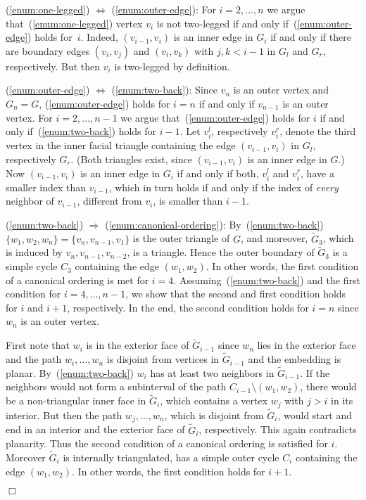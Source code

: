 \documentclass[11pt]{article}
\newenvironment{proof}{{\bf Proof:} }{\hspace*{\fill}$\Box$\vspace{2mm}}
\begin{document}
\begin{proof}
  (\ref{enum:one-legged}) $\Longleftrightarrow$ (\ref{enum:outer-edge}):
  For $i = 2,\ldots,n$ we argue that~(\ref{enum:one-legged}) vertex $v_i$
	is not two-legged
	if and only if~(\ref{enum:outer-edge}) holds for~$i$. Indeed,
  $(v_{i-1},v_i)$ is an inner edge in $G_i$ if and only if there are
  boundary edges $(v_i,v_j)$ and $(v_i,v_k)$ with $j, k < i-1$ in
  $G_l$ and $G_r$, respectively. But then $v_i$
	is two-legged by definition.

  (\ref{enum:outer-edge}) $\Longleftrightarrow$ (\ref{enum:two-back}):
  Since $v_n$ is an outer vertex and $G_n = G$, (\ref{enum:outer-edge})
  holds for $i = n$ if and only if $v_{n-1}$ is an outer vertex. For
  $i = 2,\ldots,n-1$ we argue that~(\ref{enum:outer-edge}) holds for $i$
  if and only if~(\ref{enum:two-back}) holds for $i-1$. Let $v_i^l$,
  respectively $v_i^r$, denote the third vertex in the inner facial
  triangle containing the edge $(v_{i-1},v_i)$ in $G_l$, respectively
  $G_r$. (Both triangles exist, since $(v_{i-1},v_i)$ is an inner edge
  in $G$.) Now $(v_{i-1},v_i)$ is an inner edge in $G_i$ if and only
  if both, $v_i^l$ and $v_i^r$, have a smaller index than $v_{i-1}$,
  which in turn holds if and only if the index of \emph{every}
  neighbor of $v_{i-1}$, different from $v_i$, is smaller than $i-1$.

  (\ref{enum:two-back}) $\Longrightarrow$ (\ref{enum:canonical-ordering}):
  By~(\ref{enum:two-back}) $\{w_1,w_2,w_n\} = \{v_n,v_{n-1},v_1\}$ is
  the outer triangle of $G$, and moreover, $\tilde{G}_3$, which is
  induced by $v_n,v_{n-1},v_{n-2}$, is a triangle. Hence the outer
  boundary of $\tilde{G}_3$ is a simple cycle $C_3$ containing the
  edge $(w_1,w_2)$. In other words, the first condition of a canonical
  ordering is met for $i=4$. Assuming~(\ref{enum:two-back}) and the
  first condition for $i = 4,\ldots,n-1$, we show that the second and
  first condition holds for $i$ and $i+1$, respectively. In the end,
  the second condition holds for $i = n$ since $w_n$ is an outer
  vertex.

  First note that $w_i$ is in the exterior face of $\tilde{G}_{i-1}$
  since $w_n$ lies in the exterior face and the path $w_i,\ldots,w_n$
  is disjoint from vertices in $\tilde{G}_{i-1}$ and the embedding is
  planar. By~(\ref{enum:two-back}) $w_i$ has at least two neighbors in
  $\tilde{G}_{i-1}$. If the neighbors would not form a subinterval of the path
  $C_{i-1} \setminus (w_1,w_2)$, there would be a non-triangular inner
  face in $\tilde{G}_i$, which contains a vertex $w_j$ with $j > i$ in
  its interior. But then the path $w_j,\ldots,w_n$, which is disjoint
  from $\tilde{G}_i$, would start and end in an interior and the
  exterior face of $\tilde{G}_i$, respectively. This again contradicts
  planarity. Thus the second condition of a canonical ordering is
  satisfied for $i$. Moreover $\tilde{G}_i$ is internally
  triangulated, has a simple outer cycle $C_i$ containing the edge
  $(w_1,w_2)$. In other words, the first condition holds for $i+1$.


\end{proof}
\end{document}
